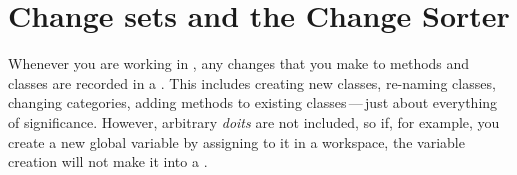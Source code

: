 \documentclass[a4paper,10pt,twoside]{book}
\begin{document}

\section{Change sets and the Change Sorter}
\label{sec:env:changeSet} %

Whenever you are working in \sq, any changes that you make to methods and classes are recorded in a .
This includes creating new classes, re-naming classes, changing categories, adding methods to existing classes\,---\,just about everything of significance.  
However, arbitrary \emph{doits} are not included, so if, for example, you create a new global variable by assigning to it in a workspace, the variable creation will not make it into a .
\end{document}
